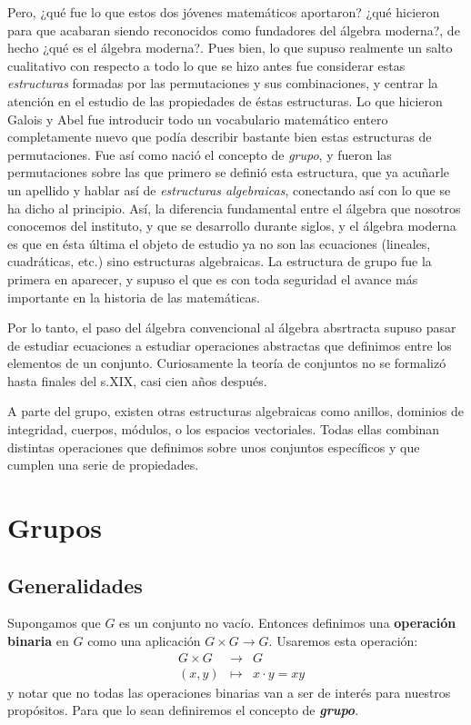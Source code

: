 \documentclass[12pt]{article}
\begin{document}
Pero, ¿qué fue lo que estos dos jóvenes matemáticos aportaron? ¿qué hicieron para que acabaran siendo reconocidos como fundadores del álgebra moderna?, de hecho ¿qué es el álgebra moderna?. Pues bien, lo que supuso realmente un salto cualitativo con respecto a todo lo que se hizo antes fue considerar estas \textit{estructuras} formadas por las permutaciones y sus combinaciones, y centrar la atención en el estudio de las propiedades de éstas estructuras. Lo que hicieron Galois y Abel fue introducir todo un vocabulario matemático entero completamente nuevo que podía describir bastante bien estas estructuras de permutaciones. Fue así como nació el concepto de \textit{grupo}, y fueron las permutaciones sobre las que primero se definió esta estructura, que ya acuñarle un apellido y hablar así de \textit{estructuras algebraicas}, conectando así con lo que se ha dicho al principio. Así, la diferencia fundamental entre el álgebra que nosotros conocemos del instituto, y que se desarrollo durante siglos, y el álgebra moderna es que en ésta última el objeto de estudio ya no son las ecuaciones (lineales, cuadráticas, etc.) sino estructuras algebraicas. La estructura de grupo fue la primera en aparecer, y supuso el que es con toda seguridad el avance más importante en la historia de las matemáticas.

Por lo tanto, el paso del álgebra convencional al álgebra absrtracta supuso pasar de estudiar ecuaciones a estudiar operaciones abstractas que definimos entre los elementos de un conjunto. Curiosamente la teoría de conjuntos no se formalizó hasta finales del s.XIX, casi cien años después. 

A parte del grupo, existen otras estructuras algebraicas como anillos, dominios de integridad, cuerpos, módulos, o los espacios vectoriales. Todas ellas combinan distintas operaciones que definimos sobre unos conjuntos específicos y que cumplen una serie de propiedades.
\newpage
\section{Grupos}
\subsection{Generalidades}

Supongamos que $G$ es un conjunto no vacío. Entonces definimos una \textbf{operación binaria} en $G$ como una aplicación $G \times G \longrightarrow G$. Usaremos esta operación:
 $$\begin{array}{rccl}
&G \times G&\longrightarrow &G \\
&(x,y)& \longmapsto &x\cdot y = xy
\end{array}
$$
y notar que no todas las operaciones binarias van a ser de interés para nuestros propósitos. Para que lo sean definiremos el concepto de \textbf{\textit{grupo}}.
\end{document}
